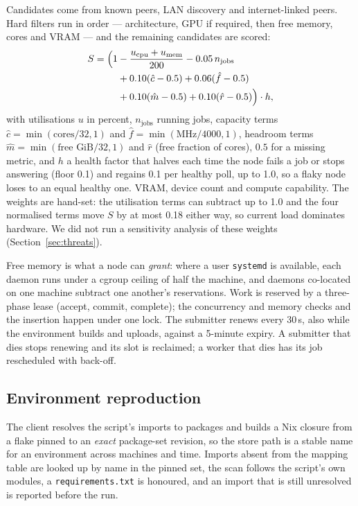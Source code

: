 \documentclass[5p,times,twocolumn]{elsarticle}
\begin{document}
Candidates come from known peers, LAN discovery and internet-linked peers.
Hard filters run in order --- architecture, GPU if required, then free memory,
cores and VRAM --- and the remaining candidates are scored:
\begin{equation}
\label{eq:score}
\begin{split}
S = \Bigl(1 &- \frac{u_{\mathrm{cpu}} + u_{\mathrm{mem}}}{200} - 0.05\,n_{\mathrm{jobs}} \\
    &+ 0.10(\hat{c}-0.5) + 0.06(\hat{f}-0.5) \\
    &+ 0.10(\hat{m}-0.5) + 0.10(\hat{r}-0.5)\Bigr)\cdot h ,
\end{split}
\end{equation}
with utilisations $u$ in percent, $n_{\text{jobs}}$ running jobs, capacity
terms $\hat{c}=\min(\text{cores}/32,1)$ and $\hat{f}=\min(\text{MHz}/4000,1)$,
headroom terms $\hat{m}=\min(\text{free GiB}/32,1)$ and $\hat{r}$ (free fraction
of cores), $0.5$ for a missing metric, and $h$ a health factor that halves each time the
node fails a job or stops answering (floor 0.1) and regains 0.1 per healthy
poll, up to 1.0, so a flaky node loses to an equal healthy one.
VRAM, device count and compute capability. The weights are hand-set: the
utilisation terms can subtract up to 1.0 and the four normalised terms move $S$
by at most 0.18 either way, so current load dominates hardware. We did not run
a sensitivity analysis of these weights (Section~\ref{sec:threats}).

Free memory is what a node can \emph{grant}: where a user \texttt{systemd} is
available, each daemon runs under a cgroup ceiling of half the machine, and
daemons co-located on one machine subtract one another's reservations. Work is
reserved by a three-phase lease (accept, commit, complete); the concurrency
and memory checks and the insertion happen under one lock. The submitter renews
every 30\,s, also while the environment builds and uploads, against a 5-minute
expiry. A submitter that dies stops renewing and its slot is reclaimed; a
worker that dies has its job rescheduled with back-off.

\subsection{Environment reproduction}
\label{sec:env}

The client resolves the script's imports to packages and builds a Nix closure
from a flake pinned to an \emph{exact} package-set revision, so the store path
is a stable name for an environment across machines and time. Imports absent
from the mapping table are looked up by name in the pinned set, the scan
follows the script's own modules, a \texttt{requirements.txt} is honoured, and
an import that is still unresolved is reported before the run.
\end{document}

